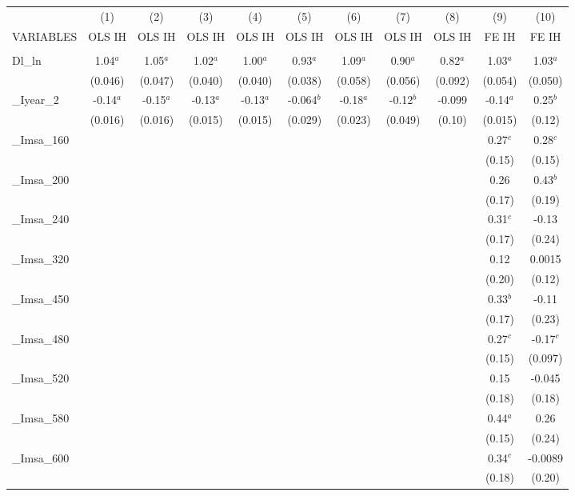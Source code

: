 \documentclass[]{article}
\begin{document}
\begin{tabular}{lcccccccccc} \hline
 & (1) & (2) & (3) & (4) & (5) & (6) & (7) & (8) & (9) & (10) \\
VARIABLES & OLS IH & OLS IH & OLS IH & OLS IH & OLS IH & OLS IH & OLS IH & OLS IH & FE IH & FE IH \\ \hline
 &  &  &  &  &  &  &  &  &  &  \\
Dl\_ln & 1.04$^a$ & 1.05$^a$ & 1.02$^a$ & 1.00$^a$ & 0.93$^a$ & 1.09$^a$ & 0.90$^a$ & 0.82$^a$ & 1.03$^a$ & 1.03$^a$ \\
 & (0.046) & (0.047) & (0.040) & (0.040) & (0.038) & (0.058) & (0.056) & (0.092) & (0.054) & (0.050) \\
\_Iyear\_2 & -0.14$^a$ & -0.15$^a$ & -0.13$^a$ & -0.13$^a$ & -0.064$^b$ & -0.18$^a$ & -0.12$^b$ & -0.099 & -0.14$^a$ & 0.25$^b$ \\
 & (0.016) & (0.016) & (0.015) & (0.015) & (0.029) & (0.023) & (0.049) & (0.10) & (0.015) & (0.12) \\
\_Imsa\_160 &  &  &  &  &  &  &  &  & 0.27$^c$ & 0.28$^c$ \\
 &  &  &  &  &  &  &  &  & (0.15) & (0.15) \\
\_Imsa\_200 &  &  &  &  &  &  &  &  & 0.26 & 0.43$^b$ \\
 &  &  &  &  &  &  &  &  & (0.17) & (0.19) \\
\_Imsa\_240 &  &  &  &  &  &  &  &  & 0.31$^c$ & -0.13 \\
 &  &  &  &  &  &  &  &  & (0.17) & (0.24) \\
\_Imsa\_320 &  &  &  &  &  &  &  &  & 0.12 & 0.0015 \\
 &  &  &  &  &  &  &  &  & (0.20) & (0.12) \\
\_Imsa\_450 &  &  &  &  &  &  &  &  & 0.33$^b$ & -0.11 \\
 &  &  &  &  &  &  &  &  & (0.17) & (0.23) \\
\_Imsa\_480 &  &  &  &  &  &  &  &  & 0.27$^c$ & -0.17$^c$ \\
 &  &  &  &  &  &  &  &  & (0.15) & (0.097) \\
\_Imsa\_520 &  &  &  &  &  &  &  &  & 0.15 & -0.045 \\
 &  &  &  &  &  &  &  &  & (0.18) & (0.18) \\
\_Imsa\_580 &  &  &  &  &  &  &  &  & 0.44$^a$ & 0.26 \\
 &  &  &  &  &  &  &  &  & (0.15) & (0.24) \\
\_Imsa\_600 &  &  &  &  &  &  &  &  & 0.34$^c$ & -0.0089 \\
 &  &  &  &  &  &  &  &  & (0.18) & (0.20) \\

\end{tabular}
\end{document}
